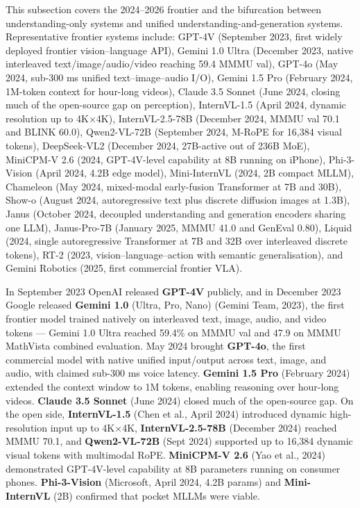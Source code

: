 This subsection covers the 2024--2026 frontier and the bifurcation between understanding-only systems and unified understanding-and-generation systems. Representative frontier systems include: GPT-4V (September 2023, first widely deployed frontier vision--language API), Gemini 1.0 Ultra (December 2023, native interleaved text/image/audio/video reaching 59.4 MMMU val), GPT-4o (May 2024, sub-300 ms unified text--image--audio I/O), Gemini 1.5 Pro (February 2024, 1M-token context for hour-long videos), Claude 3.5 Sonnet (June 2024, closing much of the open-source gap on perception), InternVL-1.5 (April 2024, dynamic resolution up to 4K×4K), InternVL-2.5-78B (December 2024, MMMU val 70.1 and BLINK 60.0), Qwen2-VL-72B (September 2024, M-RoPE for 16,384 visual tokens), DeepSeek-VL2 (December 2024, 27B-active out of 236B MoE), MiniCPM-V 2.6 (2024, GPT-4V-level capability at 8B running on iPhone), Phi-3-Vision (April 2024, 4.2B edge model), Mini-InternVL (2024, 2B compact MLLM), Chameleon (May 2024, mixed-modal early-fusion Transformer at 7B and 30B), Show-o (August 2024, autoregressive text plus discrete diffusion images at 1.3B), Janus (October 2024, decoupled understanding and generation encoders sharing one LLM), Janus-Pro-7B (January 2025, MMMU 41.0 and GenEval 0.80), Liquid (2024, single autoregressive Transformer at 7B and 32B over interleaved discrete tokens), RT-2 (2023, vision--language--action with semantic generalisation), and Gemini Robotics (2025, first commercial frontier VLA).

In September 2023 OpenAI released \textbf{GPT-4V} publicly, and in December 2023 Google released \textbf{Gemini 1.0} (Ultra, Pro, Nano) (Gemini Team, 2023), the first frontier model trained natively on interleaved text, image, audio, and video tokens --- Gemini 1.0 Ultra reached 59.4\% on MMMU val and 47.9 on MMMU MathVista combined evaluation. May 2024 brought \textbf{GPT-4o}, the first commercial model with native unified input/output across text, image, and audio, with claimed sub-300 ms voice latency. \textbf{Gemini 1.5 Pro} (February 2024) extended the context window to 1M tokens, enabling reasoning over hour-long videos. \textbf{Claude 3.5 Sonnet} (June 2024) closed much of the open-source gap. On the open side, \textbf{InternVL-1.5} (Chen et al., April 2024) introduced dynamic high-resolution input up to 4K×4K, \textbf{InternVL-2.5-78B} (December 2024) reached MMMU 70.1, and \textbf{Qwen2-VL-72B} (Sept 2024) supported up to 16,384 dynamic visual tokens with multimodal RoPE. \textbf{MiniCPM-V 2.6} (Yao et al., 2024) demonstrated GPT-4V-level capability at 8B parameters running on consumer phones. \textbf{Phi-3-Vision} (Microsoft, April 2024, 4.2B params) and \textbf{Mini-InternVL} (2B) confirmed that pocket MLLMs were viable.

